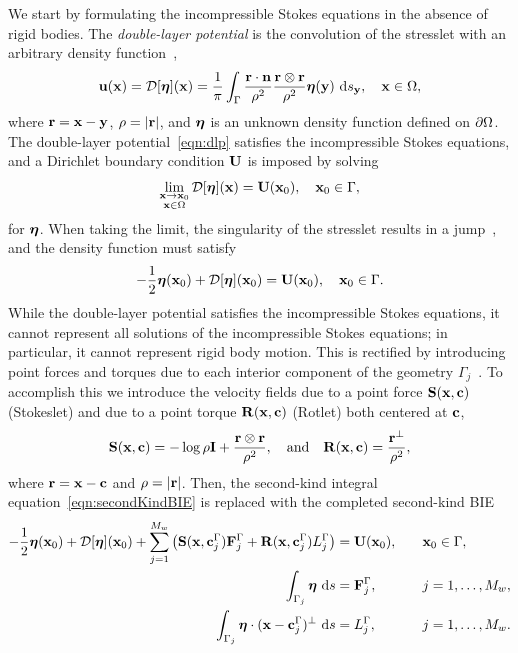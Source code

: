 \documentclass[preprint, 10pt]{elsarticle}
\begin{document}
We start by formulating the incompressible Stokes equations in the
absence of rigid bodies.  The {\em double-layer potential} is the
convolution of the stresslet with an arbitrary density
function~\cite{Ladyzhenskaya1963, Pozrikidis1992},
\begin{align}
  \label{eqn:dlp}
  {\mathbf{u}}({\mathbf{x}}) = {\mathcal{D}}[{\boldsymbol\eta}]({\mathbf{x}}) = \frac{1}{\pi}\int_{\Gamma}
  \frac{{\mathbf{r}}\cdot{\mathbf{n}}}{\rho^2}\frac{{\mathbf{r}} \otimes {\mathbf{r}}}{\rho^2}
  {\boldsymbol\eta}({\mathbf{y}})~\text{d}s_{{\mathbf{y}}}, \quad {\mathbf{x}} \in \Omega,
\end{align}
where ${\mathbf{r}} = {\mathbf{x}} - {\mathbf{y}}$, $\rho=|{\mathbf{r}}|$, and ${\boldsymbol\eta}$ is an unknown density
function defined on ${\partial}\Omega$.  The double-layer
potential~\eqref{eqn:dlp} satisfies the incompressible Stokes equations,
and a Dirichlet boundary condition ${\mathbf{U}}$ is imposed by solving
\begin{align*}
  \lim_{\substack{{\mathbf{x}} \rightarrow {\mathbf{x}}_0 \\ {\mathbf{x}} \in \Omega}}
    {\mathcal{D}}[{\boldsymbol\eta}]({\mathbf{x}}) = {\mathbf{U}}({\mathbf{x}}_0), \quad {\mathbf{x}}_0 \in \Gamma,
\end{align*}
for ${\boldsymbol\eta}$.  When taking the limit, the
singularity of the stresslet results in a jump~\cite{Pozrikidis1992},
and the density function must satisfy  
\begin{align}
  -\frac{1}{2} {\boldsymbol\eta}({\mathbf{x}}_0) + {\mathcal{D}}[{\boldsymbol\eta}]({\mathbf{x}}_0) = {\mathbf{U}}({\mathbf{x}}_0), 
    \quad {\mathbf{x}}_0 \in \Gamma.
  \label{eqn:secondKindBIE}
\end{align}
While the double-layer potential satisfies the incompressible Stokes
equations, it cannot represent all solutions of the incompressible
Stokes equations; in particular, it cannot represent rigid body motion.
This is rectified by introducing point forces and torques due to each
interior component of the geometry $\Gamma_j$~\cite{Power1987,
Power1993}.  To accomplish this we introduce the velocity fields due to a
point force $\mathbf{S}({\mathbf{x}},{\mathbf{c}})$ (Stokeslet) and due to a 
point torque $\mathbf{R}({\mathbf{x}},{\mathbf{c}})$ (Rotlet) both centered at ${\mathbf{c}}$,
\begin{align*}
  \mathbf{S}({\mathbf{x}},{\mathbf{c}}) = -\log\rho\mathbf{I} + 
  \frac{{\mathbf{r}} \otimes {\mathbf{r}}}{\rho^2}, \quad \text{and} \quad
  \mathbf{R}({\mathbf{x}},{\mathbf{c}}) = \frac{{\mathbf{r}}^\perp}{\rho^2},
\end{align*}
where ${\mathbf{r}} = {\mathbf{x}} - {\mathbf{c}}$ and $\rho = |{\mathbf{r}}|$.  Then, the second-kind
integral equation~\eqref{eqn:secondKindBIE} is replaced with the
completed second-kind BIE
\begin{equation}
  \label{eqn:completed_DLP}
  \begin{split}
  -\frac{1}{2}{\boldsymbol\eta}({\mathbf{x}}_0) + {\mathcal{D}}[{\boldsymbol\eta}]({\mathbf{x}}_0) + 
    \sum_{j=1}^{M_w} \left(\mathbf{S}({\mathbf{x}},{\mathbf{c}}^\Gamma_j){\mathbf{F}}^\Gamma_j + 
      \mathbf{R}({\mathbf{x}},{\mathbf{c}}^\Gamma_j)L^\Gamma_j\right) &= {\mathbf{U}}({\mathbf{x}}_0),
      \quad &&{\mathbf{x}}_0 \in \Gamma, \\
  \int_{\Gamma_j} {\boldsymbol\eta}~\text{d}s &= {\mathbf{F}}^\Gamma_j, 
      &&j=1,\ldots,M_w, \\
  \int_{\Gamma_j} {\boldsymbol\eta}\cdot ({\mathbf{x}} - {\mathbf{c}}^\Gamma_j)^\perp~\text{d}s &=   
      L^\Gamma_j, &&j=1,\ldots,M_w.
  \end{split}
\end{equation}
\end{document}
